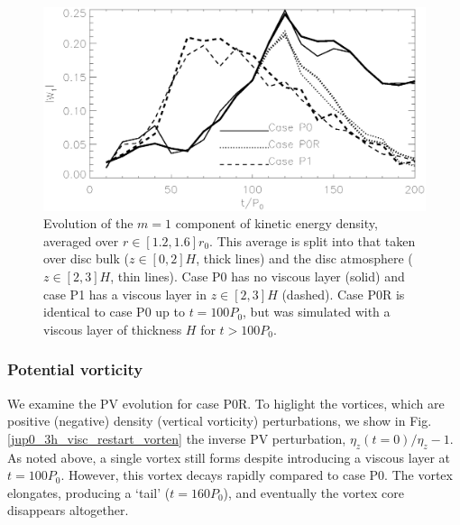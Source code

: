 \begin{figure}
  \centering
  \includegraphics[width=\linewidth]{figures/pdisk_kerz_cases_planet_m1}
  \caption{Evolution of the $m=1$ component of kinetic energy density,
    averaged over $r\in[1.2,1.6]r_0$. This average
    is split into that taken over disc bulk ($z\in[0,2]H$, thick
    lines) and the disc atmosphere ($z\in[2,3]H$, thin lines). Case P0
    has no viscous layer (solid) and case P1 has a viscous layer in
    $z\in[2,3]H$ (dashed). Case P0R is identical to case P0 up to $t=100P_0$,
    but was simulated with a viscous layer of thickness
    $H$ for $t>100P_0$. 
\label{pdisk_kerz_cases_planet}}
\end{figure}

\subsubsection{Potential vorticity}%
We examine the PV evolution for case P0R. To higlight the vortices, which are positive (negative)
density (vertical vorticity) perturbations, we show in
Fig. \ref{jup0_3h_visc_restart_vorten} the inverse PV perturbation,
$\eta_z(t=0)/\eta_z - 1$. As noted above, a single vortex still forms
despite introducing a viscous layer at $t=100P_0$. However, this
vortex decays rapidly compared to case P0. The vortex elongates,
producing a `tail' ($t=160P_0$), and eventually the vortex core
disappears altogether. 


